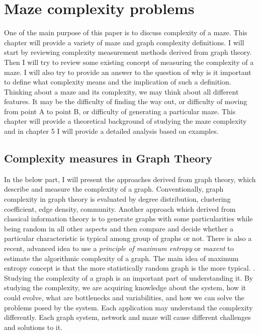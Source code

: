 \chapter{Maze complexity problems}\label{cha:background}
One of the main purpose of this paper is to discuss complexity of a maze. This chapter will provide a variety of maze and graph complexity definitions. I will start by reviewing complexity measurement methods derived from graph theory. 
Then I will try to review some existing concept of measuring the complexity of a maze.
I will also try to provide an answer to the question of why is it important to define what complexity means and the implication of such a definition. Thinking about a maze and its complexity, we may think about all different features. 
It may be the difficulty of finding the way out, or difficulty of moving from point A to point B, or difficulty of generating a particular maze. This chapter will provide a theoretical background of studying the maze complexity and in chapter 5 I will provide a detailed analysis based on examples. 
\section{Complexity measures in Graph Theory}
In the below part, I will present the approaches derived from graph theory, which describe and measure the complexity of a graph.
 Conventionally, graph complexity in graph theory is evaluated by degree distribution, clustering coefficient, edge density, community. Another approach which derived from classical information theory is to generate graphs with some particularities while being random in all other aspects and then compare and decide whether a particular characteristic is typical among group of graphs or not.
There is also a recent, advanced idea to use a \textit{principle of maximum entropy} or \textit{maxent} to estimate the algorithmic complexity of a graph. The main idea of maximum entropy concept is that the more statistically random graph is the more typical. \cite{HeZeni}. 
Studying the complexity of a graph is an important part of understanding it. By studying the complexity, we are acquiring knowledge about the system, how it could evolve, what are bottlenecks and variabilities, and how we can solve the problems posed by the system. Each application may understand the complexity differently. 
Each graph system, network and maze will cause different challenges and solutions to it. 
